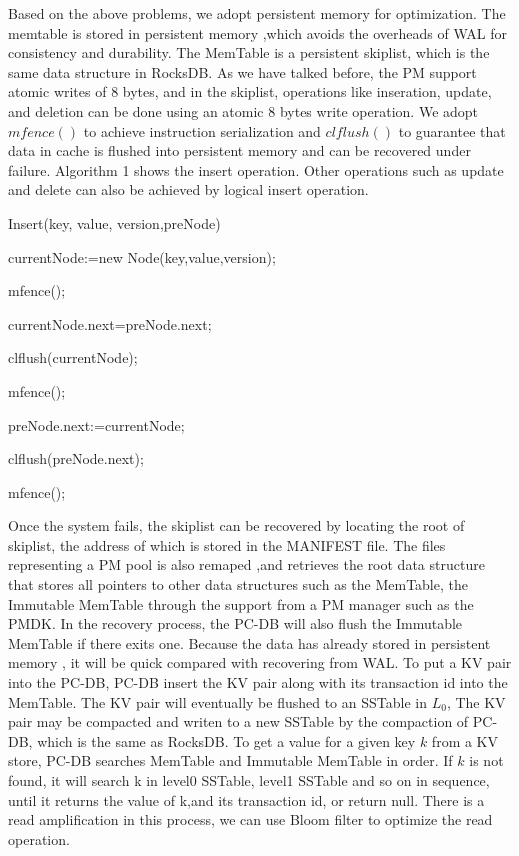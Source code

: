 Based on the above problems, we adopt persistent memory for optimization. 
The memtable is stored in persistent memory ,which avoids the overheads of WAL for consistency and durability. 
The MemTable is a persistent skiplist, which is the same data structure in  RocksDB. As we have talked before, the PM support atomic writes of 8 bytes, and in the skiplist, operations like inseration, update, and deletion can be done using an atomic 8 bytes write operation.
We adopt  $mfence()$ to achieve instruction serialization and $clflush()$ to guarantee that data in cache is flushed into persistent memory and can be recovered under failure. 
Algorithm 1 shows the insert operation. Other operations such as update and delete can also be achieved by logical insert operation.

\begin{algorithm}[t]
\caption{Insert(key, value, version,preNode)} %


currentNode:=new Node(key,value,version);

mfence();

currentNode.next=preNode.next;

clflush(currentNode);

mfence();

preNode.next:=currentNode;

clflush(preNode.next);

mfence();

\end{algorithm}

Once the system fails, 
the skiplist can be recovered  by locating the root of skiplist, 
the address of which is stored in the MANIFEST file. The files representing a PM pool is also remaped ,and retrieves the root data structure that stores all pointers to other data structures such as the MemTable, the Immutable MemTable through the support from a PM manager such as the PMDK. In the recovery process, the PC-DB will also flush the Immutable MemTable if there exits one.
Because the data has already stored in persistent memory , 
it will be quick compared with recovering from WAL.
To put a KV pair into the PC-DB, PC-DB insert the KV pair along with its transaction id into the MemTable. The KV pair will eventually be flushed to an SSTable in $L_0$, The KV pair may be compacted and writen to a new SSTable by the compaction of PC-DB, which is the same as RocksDB.
To get a value for a given key $k$ from a KV store, PC-DB searches MemTable and Immutable MemTable in order. If $k$ is not found, it will search k in level0 SSTable, level1 SSTable and so on in sequence, until it returns the value of k,and its transaction id, or return null. There is a read amplification in this process, we can use Bloom filter to optimize the read operation.


